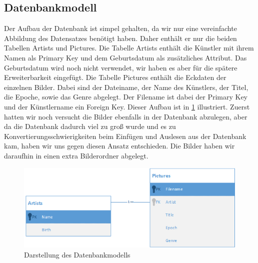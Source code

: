 \subsection{Datenbankmodell}\label{datenbankmodell}
Der Aufbau der Datenbank ist simpel gehalten, da wir nur eine vereinfachte Abbildung des Datensatzes benötigt haben. Daher enthält er nur die beiden Tabellen Artists und Pictures. Die Tabelle Artists enthält die Künstler mit ihrem Namen als Primary Key und dem Geburtsdatum als zusätzliches Attribut. Das Geburtsdatum wird noch nicht verwendet, wir haben es aber für die spätere Erweiterbarkeit eingefügt. Die Tabelle Pictures enthält die Eckdaten der einzelnen Bilder. Dabei sind der Dateiname, der Name des Künstlers, der Titel, die Epoche, sowie das Genre abgelegt. Der Filename ist dabei der Primary Key und der Künstlername ein Foreign Key. Dieser Aufbau ist in \ref{datenbank} illustriert. Zuerst hatten wir noch versucht die Bilder ebenfalls in der Datenbank abzulegen, aber da die Datenbank dadurch viel zu groß wurde und es zu Konvertierungsschwierigkeiten beim Einfügen und Auslesen aus der Datenbank kam, haben wir uns gegen diesen Ansatz entschieden. Die Bilder haben wir daraufhin in einen extra Bilderordner abgelegt.

\begin{figure}[H]
	\centerline{\includegraphics[width=0.7\linewidth]{figures/Datenbankmodell.png}}
	\caption{Darstellung des Datenbankmodells}
	\label{datenbank}
\end{figure}

\newpage

